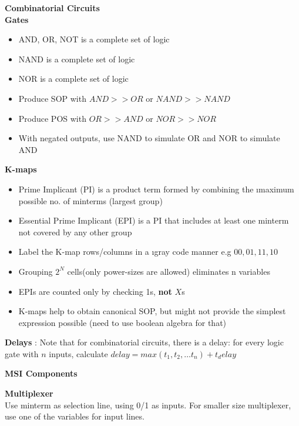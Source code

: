 \documentclass[a4paper]{article} \usepackage[backend=biber, style=numeric, sorting=none]{biblatex}
\begin{document}
\begin{multicols*}{4}
{\small\textbf{Combinatorial Circuits}}
\\ \textbf{Gates}
\begin{itemize}[leftmargin=*]
\itemsep -0.5em
\item {AND, OR, NOT} is a complete set of logic
\item {NAND} is a complete set of logic
\item {NOR} is a complete set of logic
\item Produce SOP with $AND >> OR$ or $NAND >> NAND$
\item Produce POS with $OR >> AND$ or $NOR >> NOR$
\item With negated outputs, use NAND to simulate OR and NOR to simulate AND
\end{itemize}

\textbf{K-maps}
\begin{itemize}[leftmargin=*]
\itemsep -0.5em
\item Prime Implicant (PI) is a product term formed by combining the {\i maximum} possible no. of minterms (largest group)
\item Essential Prime Implicant (EPI) is a PI that includes at least one minterm not covered by any other group
\item Label the K-map rows/columns in a {\i gray code} manner e.g $00, 01, 11, 10$
\item Grouping $2^N$ cells(only power-sizes are allowed) eliminates n variables
\item EPIs are counted only by checking 1s, {\bf not} $X$s
\item K-maps help to obtain canonical SOP, but might not provide the simplest expression possible (need to use boolean algebra for that)
\end{itemize}

\textbf {Delays} : Note that for combinatorial circuits, there is a delay: for every logic gate with $n$ inputs, calculate $delay = max(t_1, t_2, \dots t_n) + t_delay$
\begin{center}
\end{center}

\columnbreak
{\small\textbf{MSI Components}}

\begin{multicols*}{2}
\textbf{{Multiplexer}}
\\ Use minterm as selection line, using 0/1 as inputs. For smaller size multiplexer, use one of the variables for input lines.
\vfill\null
\columnbreak
\end{multicols*}


\end{multicols*}
\end{document}
